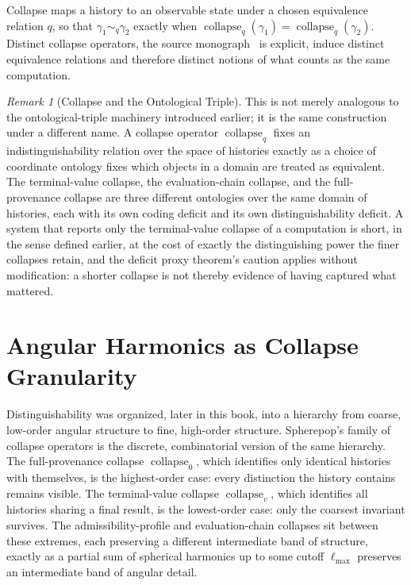 \documentclass[11pt,fleqn]{book}
\numberwithin{equation}{chapter}
\theoremstyle{plain}
\theoremstyle{definition}
\theoremstyle{remark}
\newtheorem{remark}[theorem]{Remark}
\providecommand{\scollapse}[1]{\operatorname{collapse}_{#1}}
\begin{document}
Collapse maps a history to an observable state under a chosen equivalence relation \(q\), so that \(\gamma_1\sim_q\gamma_2\) exactly when \(\scollapse{q}(\gamma_1)=\scollapse{q}(\gamma_2)\). Distinct collapse operators, the source monograph~\cite{spherepop-histories} is explicit, induce distinct equivalence relations and therefore distinct notions of what counts as the same computation.

\begin{remark}[Collapse and the Ontological Triple]
This is not merely analogous to the ontological-triple machinery introduced earlier; it is the same construction under a different name. A collapse operator \(\scollapse{q}\) fixes an indistinguishability relation over the space of histories exactly as a choice of coordinate ontology fixes which objects in a domain are treated as equivalent. The terminal-value collapse, the evaluation-chain collapse, and the full-provenance collapse are three different ontologies over the same domain of histories, each with its own coding deficit and its own distinguishability deficit. A system that reports only the terminal-value collapse of a computation is short, in the sense defined earlier, at the cost of exactly the distinguishing power the finer collapses retain, and the deficit proxy theorem's caution applies without modification: a shorter collapse is not thereby evidence of having captured what mattered.
\end{remark}

\section{Angular Harmonics as Collapse Granularity}

Distinguishability was organized, later in this book, into a hierarchy from coarse, low-order angular structure to fine, high-order structure. Spherepop's family of collapse operators is the discrete, combinatorial version of the same hierarchy. The full-provenance collapse \(\scollapse{0}\), which identifies only identical histories with themselves, is the highest-order case: every distinction the history contains remains visible. The terminal-value collapse \(\scollapse{v}\), which identifies all histories sharing a final result, is the lowest-order case: only the coarsest invariant survives. The admissibility-profile and evaluation-chain collapses sit between these extremes, each preserving a different intermediate band of structure, exactly as a partial sum of spherical harmonics up to some cutoff \(\ell_{\max}\) preserves an intermediate band of angular detail.
\end{document}
